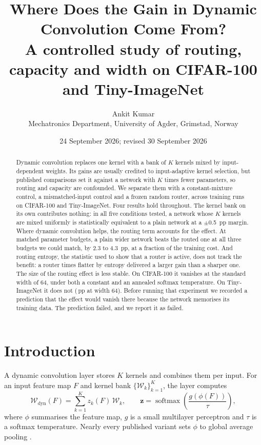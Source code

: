 \documentclass[10pt,a4paper]{article}
\title{\vspace{-1.3cm}\textbf{Where Does the Gain in Dynamic Convolution Come From?}\\[3pt]
\large A controlled study of routing, capacity and width on CIFAR-100 and Tiny-ImageNet}
\author{Ankit Kumar\\\small Mechatronics Department, University of Agder, Grimstad, Norway}
\date{\small 24 September 2026; revised 30 September 2026}
\newcommand{\zv}{\mathbf{z}}
\begin{document}
\maketitle
\vspace{-0.6cm}

\begin{abstract}
\noindent
Dynamic convolution replaces one kernel with a bank of $K$ kernels mixed
by input-dependent weights. Its gains are usually credited to
input-adaptive kernel selection, but published comparisons set it
against a network with $K$ times fewer parameters, so routing and
capacity are confounded. We separate them with a constant-mixture
control, a mismatched-input control and a frozen random router, across
 training runs on CIFAR-100 and Tiny-ImageNet. Four results hold
throughout. The kernel bank on its own contributes nothing: in all five
conditions tested, a network whose $K$ kernels are mixed uniformly is
statistically equivalent to a plain network at a $\pm$\SI{0.5}{pp}
margin. Where dynamic convolution helps, the routing term accounts for
the effect. At matched parameter budgets, a plain wider network beats the
routed one at all three budgets we could match, by 2.3 to
\SI{4.3}{pp}, at a fraction of the training cost. And routing entropy,
the statistic used to show that a router is active, does not track the
benefit: a router  times flatter by entropy delivered a larger gain
than a sharper one. The size of the routing effect is less stable. On
CIFAR-100 it vanishes at the standard width of 64, under both a constant
and an annealed softmax temperature. On Tiny-ImageNet it does not
(\,pp at width 64). Before running that experiment we recorded
a prediction that the effect would vanish there because the network
memorises its training data. The prediction failed, and we report it as
failed.
\end{abstract}

\section{Introduction}

A dynamic convolution layer stores $K$ kernels and combines them per
input. For an input feature map $F$ and kernel bank
$\{\mathcal{W}_k\}_{k=1}^{K}$, the layer computes
\begin{equation}
\mathcal{W}_{\text{dyn}}(F)=\sum_{k=1}^{K} z_k(F)\,\mathcal{W}_k,
\qquad
\zv=\operatorname{softmax}\!\left(\frac{g(\phi(F))}{\tau}\right),
\label{eq:dynconv}
\end{equation}
where $\phi$ summarises the feature map, $g$ is a small multilayer
perceptron and $\tau$ is a softmax temperature. Nearly every published
variant sets $\phi$ to global average pooling
\citep{yang2019condconv,chen2020dynamic}.
\end{document}
